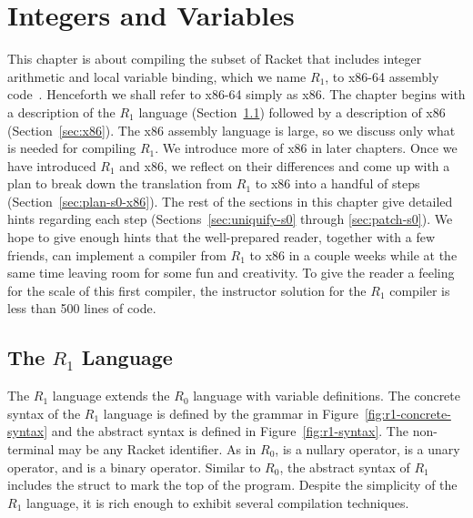 \documentclass[11pt]{book}
\begin{document}
\chapter{Integers and Variables}
\label{ch:int-exp}

This chapter is about compiling the subset of Racket that includes
integer arithmetic and local variable binding, which we name $R_1$, to
x86-64 assembly code~\citep{Intel:2015aa}.  Henceforth we shall refer
to x86-64 simply as x86.  The chapter begins with a description of the
$R_1$ language (Section~\ref{sec:s0}) followed by a description of x86
(Section~\ref{sec:x86}). The x86 assembly language is large, so we
discuss only what is needed for compiling $R_1$. We introduce more of
x86 in later chapters. Once we have introduced $R_1$ and x86, we
reflect on their differences and come up with a plan to break down the
translation from $R_1$ to x86 into a handful of steps
(Section~\ref{sec:plan-s0-x86}).  The rest of the sections in this
chapter give detailed hints regarding each step
(Sections~\ref{sec:uniquify-s0} through \ref{sec:patch-s0}).  We hope
to give enough hints that the well-prepared reader, together with a
few friends, can implement a compiler from $R_1$ to x86 in a couple
weeks while at the same time leaving room for some fun and creativity.
To give the reader a feeling for the scale of this first compiler, the
instructor solution for the $R_1$ compiler is less than 500 lines of
code.

\section{The $R_1$ Language}
\label{sec:s0}

The $R_1$ language extends the $R_0$ language with variable
definitions.  The concrete syntax of the $R_1$ language is defined by
the grammar in Figure~\ref{fig:r1-concrete-syntax} and the abstract
syntax is defined in Figure~\ref{fig:r1-syntax}.  The non-terminal
\Var{} may be any Racket identifier. As in $R_0$,  is a
nullary operator, \key{-} is a unary operator, and \key{+} is a binary
operator.  Similar to $R_0$, the abstract syntax of $R_1$ includes the
 struct to mark the top of the program.
Despite the simplicity of the $R_1$ language, it is rich enough to
exhibit several compilation techniques.
\end{document}
